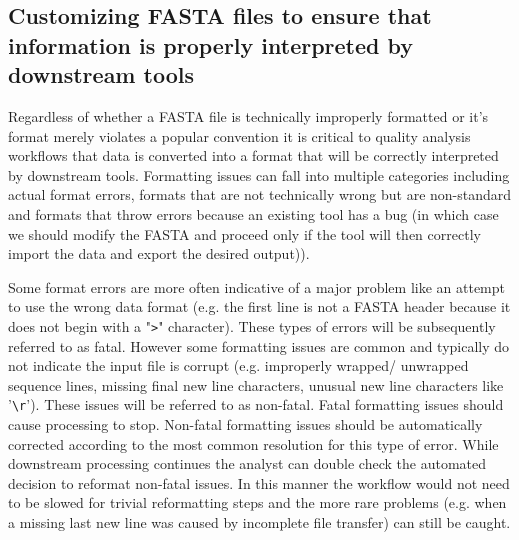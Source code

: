\subsection{Customizing FASTA files to ensure that information is properly interpreted by downstream tools}

Regardless of whether a FASTA file is technically improperly formatted or it's format merely violates a popular convention it is critical to quality analysis workflows that data is converted into a format that will be correctly interpreted by downstream tools. Formatting issues can fall into multiple categories including actual format errors, formats that are not technically wrong but are non-standard and formats that throw errors because an existing tool has a bug (in which case we should modify the FASTA and proceed only if the tool will then correctly import the data and export the desired output)). 

Some format errors are more often indicative of a major problem like an attempt to use the wrong data format (e.g. the first line is not a FASTA header because it does not begin with a "\verb|>|" character). These types of errors will be subsequently referred to as fatal. However some formatting issues are common and typically do not indicate the input file is corrupt (e.g. improperly wrapped/ unwrapped sequence lines, missing final new line characters, unusual new line characters like '\verb|\r|'). These issues will be referred to as non-fatal. Fatal formatting issues should cause processing to stop. Non-fatal formatting issues should be automatically corrected according to the most common resolution for this type of error. While downstream processing continues the analyst can double check the automated decision to reformat non-fatal issues. In this manner the workflow would not need to be slowed for trivial reformatting steps and the more rare problems (e.g. when a missing last new line was caused by incomplete file transfer) can still be caught.
  

  